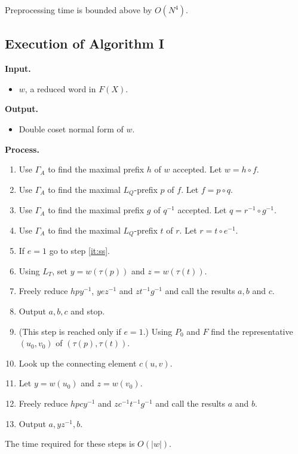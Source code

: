 \documentclass[a4paper,12pt]{article}
\newcommand{\G}{\Gamma }
\renewcommand{\t}{\tau }
\numberwithin{equation}{section}
\numberwithin{figure}{section}
\newcommand{\be}{\begin{enumerate}}
\newcommand{\ee}{\end{enumerate}}
\newcommand{\biz}{\begin{itemize}}
\newcommand{\eiz}{\end{itemize}}
\begin{document}
Preprocessing time is bounded above by $O(N^4)$. 
\subsection{Execution of Algorithm I}
\noindent\textbf{Input.}
\biz
\item $w$, a reduced word in $F(X)$.
\eiz
\noindent\textbf{Output.} 
\biz
\item Double coset normal form of $w$. 
\eiz
\noindent\textbf{Process.}
\be
\item Use $\G_A$ to find the maximal prefix $h$ of $w$ accepted. 
Let $w=h\circ f$. 
\item Use $\G_A$ to find the maximal $L_Q$-prefix $p$ of $f$. 
Let $f=p\circ q$.
\item Use $\G_A$ to find the maximal prefix $g$ of $q^{-1}$ accepted.
Let $q=r^{-1}\circ g^{-1}$.
\item Use $\G_A$ to find the maximal $L_Q$-prefix $t$ of $r$. 
Let $r=t\circ e^{-1}$. 
\item If $e=1$ go to step \ref{it:ss}.
\item Using $L_T$, set $y=w(\t(p))$ and $z=w(\t(t))$.
\item Freely reduce $hpy^{-1}$, $yez^{-1}$ and $zt^{-1}g^{-1}$ and 
call the results   $a, b$ and $c$. 
\item Output $a,b,c$ and stop.
\item\label{it:ss} (This step is reached only if $e= 1$.)
 Using $P_0$ and $F$ find the representative $(u_0,v_0)$ of $(\t(p),\t(t))$.
\item Look up the connecting element $c(u,v)$. 
\item Let $y=w(u_0)$ and $z=w(v_0)$. 
\item Freely reduce $hpcy^{-1}$ and $zc^{-1}t^{-1}g^{-1}$ and call the 
results $a$ and $b$.
\item Output $a,yz^{-1},b$.
\ee
The time required for these steps is $O(|w|)$. 
\end{document}
